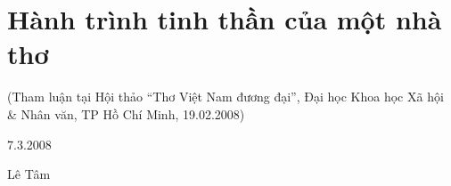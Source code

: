 \documentclass[../main.tex]{subfiles}
\begin{document}
\chapter{Hành trình tinh thần của một nhà thơ}

\begin{subtitle}

(Tham luận tại Hội thảo “Thơ Việt Nam đương đại”, Đại học Khoa học Xã hội & Nhân văn, TP Hồ Chí Minh, 19.02.2008)

\end{subtitle}

\begin{metadata}

\begin{flushright}7.3.2008\end{flushright}

Lê Tâm



\end{metadata}
\end{document}
